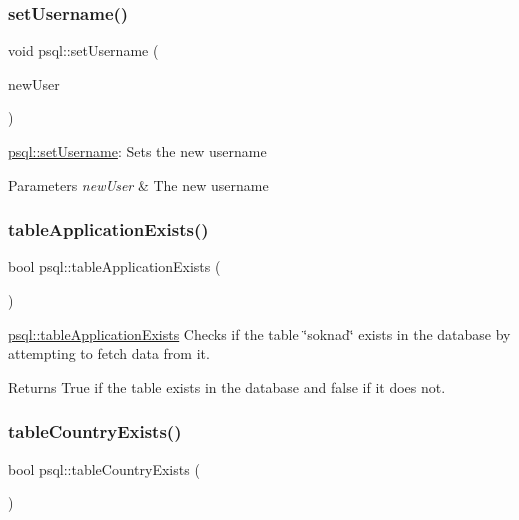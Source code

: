 \subsubsection{\texorpdfstring{setUsername()}{setUsername()}}
{\footnotesize\ttfamily void psql\+::set\+Username (\begin{DoxyParamCaption}\item[{Q\+String}]{new\+User }\end{DoxyParamCaption})}



\mbox{\hyperlink{classpsql_a1488a9e4909abd172651b7be240342cb}{psql\+::set\+Username}}\+: Sets the new username 


\begin{DoxyParams}{Parameters}
{\em new\+User} & The new username \\
\hline
\end{DoxyParams}
\mbox{\label{classpsql_a117b616053845f1b7295b21a06f008fd}} 
\subsubsection{\texorpdfstring{tableApplicationExists()}{tableApplicationExists()}}
{\footnotesize\ttfamily bool psql\+::table\+Application\+Exists (\begin{DoxyParamCaption}{ }\end{DoxyParamCaption})}



\mbox{\hyperlink{classpsql_a117b616053845f1b7295b21a06f008fd}{psql\+::table\+Application\+Exists}} Checks if the table \char`\"{}soknad\char`\"{} exists in the database by attempting to fetch data from it. 

\begin{DoxyReturn}{Returns}
True if the table exists in the database and false if it does not. 
\end{DoxyReturn}
\mbox{\label{classpsql_ae0ab0012c58471bd3fd63c286fb22224}} 
\subsubsection{\texorpdfstring{tableCountryExists()}{tableCountryExists()}}
{\footnotesize\ttfamily bool psql\+::table\+Country\+Exists (\begin{DoxyParamCaption}{ }\end{DoxyParamCaption})}



